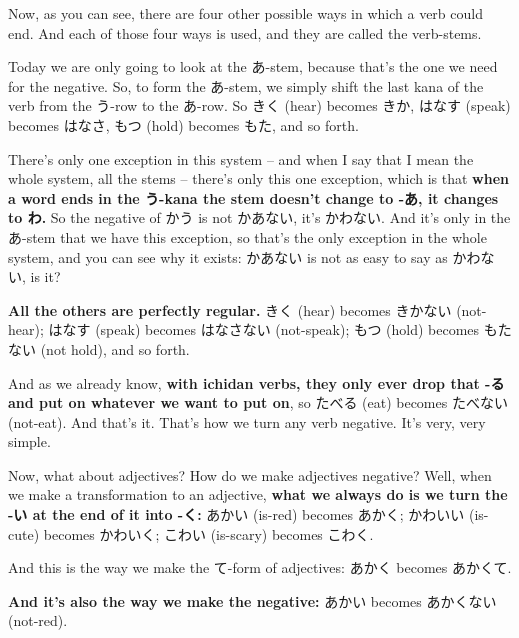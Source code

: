Now, as you can see, there are four other possible ways in which a verb could end. And each of those four ways is used, and they are called the verb-stems.

{}

Today we are only going to look at the あ-stem, because that's the one we need for the negative. So, to form the あ-stem, we simply shift the last kana of the verb from the う-row to the あ-row. So きく (hear) becomes きか, はなす (speak) becomes はなさ, もつ (hold) becomes もた, and so forth.

{}

There's only one exception in this system -- and when I say that I mean the whole system, all the stems -- there's only this one exception, which is that {\bf when a word ends in the う-kana the stem doesn't change to -あ, it changes to わ.} So the negative of かう is not かあない, it's かわない. And it's only in the あ-stem that we have this exception, so that's the only exception in the whole system, and you can see why it exists: かあない is not as easy to say as かわない, is it?

{\bf All the others are perfectly regular.} きく (hear) becomes きかない (not-hear); はなす (speak) becomes はなさない (not-speak); もつ (hold) becomes もたない (not hold), and so forth.

And as we already know, {\bf with ichidan verbs, they only ever drop that -る and put on whatever we want to put on}, so たべる (eat) becomes たべない (not-eat). And that's it. That's how we turn any verb negative. It's very, very simple.

\stopsectionlevel

\startsectionlevel[title={Negative forms of adjectives},reference={negative-forms-of-adjectives}]

Now, what about adjectives? How do we make adjectives negative? Well, when we make a transformation to an adjective, {\bf what we always do is we turn the -い at the end of it into -く:} あかい (is-red) becomes あかく; かわいい (is-cute) becomes かわいく; こわい (is-scary) becomes こわく.

{}

And this is the way we make the て-form of adjectives: あかく becomes あかくて.

{}

{\bf And it's also the way we make the negative:} あかい becomes あかくない (not-red).

